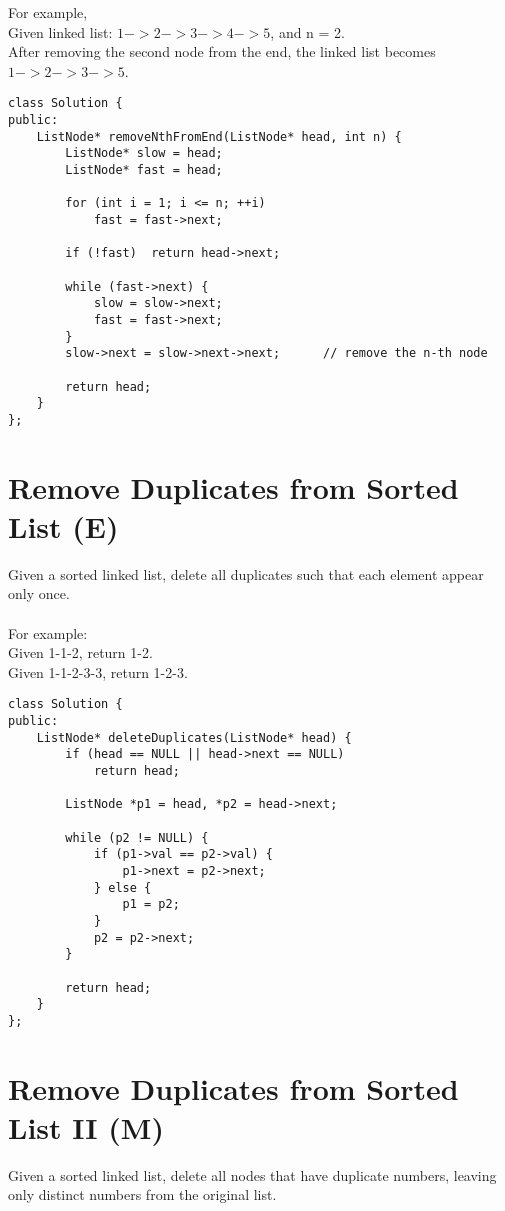 For example,\\
   Given linked list: $1->2->3->4->5$, and n = 2.\\
   After removing the second node from the end, the linked list becomes $1->2->3->5$.\\

\begin{lstlisting}
class Solution {
public:
    ListNode* removeNthFromEnd(ListNode* head, int n) {
        ListNode* slow = head;
        ListNode* fast = head;
        
        for (int i = 1; i <= n; ++i)
            fast = fast->next;
            
        if (!fast)  return head->next;
        
        while (fast->next) {
            slow = slow->next;
            fast = fast->next;
        }
        slow->next = slow->next->next;      // remove the n-th node
        
        return head;
    }
};
\end{lstlisting}


\section{Remove Duplicates from Sorted List (E)}

Given a sorted linked list, delete all duplicates such that each element appear only once.\\ \\
For example: \\
Given 1-1-2, return 1-2. \\
Given 1-1-2-3-3, return 1-2-3. \\

\begin{lstlisting}
class Solution {
public:
    ListNode* deleteDuplicates(ListNode* head) {
        if (head == NULL || head->next == NULL)
            return head;
        
        ListNode *p1 = head, *p2 = head->next;
        
        while (p2 != NULL) {
            if (p1->val == p2->val) {
                p1->next = p2->next; 
            } else {
                p1 = p2;
            }
            p2 = p2->next;
        }
        
        return head;
    }
};
\end{lstlisting}


\section{Remove Duplicates from Sorted List II (M)}
Given a sorted linked list, delete all nodes that have duplicate numbers, leaving only distinct numbers from the original list.\\

